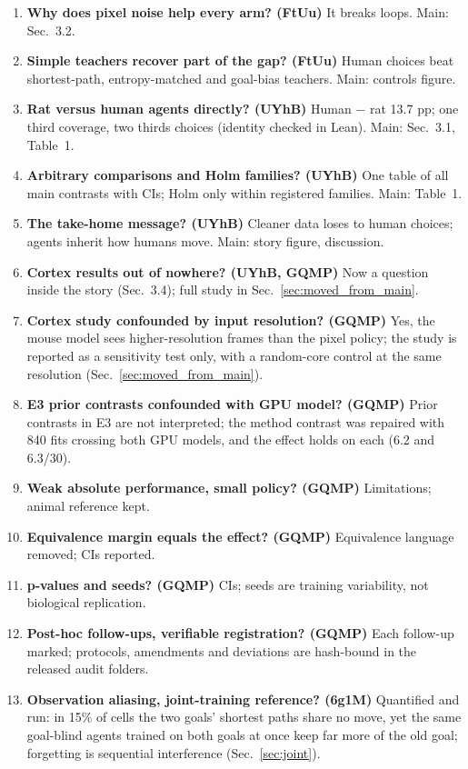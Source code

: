 \documentclass[10pt,onecolumn,letterpaper]{article}
\begin{document}
\begin{small}
\begin{enumerate}
loops, the humans' own habit of not going back. Main: story a--b, Sec.~3.2.
\item \textbf{Why does pixel noise help every arm? (FtUu)} It breaks loops. Main: Sec.~3.2.
\item \textbf{Simple teachers recover part of the gap? (FtUu)} Human choices beat shortest-path, entropy-matched and
goal-bias teachers. Main: controls figure.
\item \textbf{Rat versus human agents directly? (UYhB)} Human $-$ rat 13.7 pp; one third coverage, two thirds
choices (identity checked in Lean). Main: Sec.~3.1, Table~1.
\item \textbf{Arbitrary comparisons and Holm families? (UYhB)} One table of all main contrasts with CIs; Holm only
within registered families. Main: Table~1.
\item \textbf{The take-home message? (UYhB)} Cleaner data loses to human choices; agents inherit how humans move.
Main: story figure, discussion.
\item \textbf{Cortex results out of nowhere? (UYhB, GQMP)} Now a question inside the story (Sec.~3.4); full study in
Sec.~\ref{sec:moved_from_main}.
\item \textbf{Cortex study confounded by input resolution? (GQMP)} Yes, the mouse model sees higher-resolution frames
than the pixel policy; the study is reported as a sensitivity test only, with a random-core control at the same
resolution (Sec.~\ref{sec:moved_from_main}).
\item \textbf{E3 prior contrasts confounded with GPU model? (GQMP)} Prior contrasts in E3 are not interpreted; the
method contrast was repaired with 840 fits crossing both GPU models, and the effect holds on each (6.2 and 6.3/30).
\item \textbf{Weak absolute performance, small policy? (GQMP)} Limitations; animal reference kept.
\item \textbf{Equivalence margin equals the effect? (GQMP)} Equivalence language removed; CIs reported.
\item \textbf{p-values and seeds? (GQMP)} CIs; seeds are training variability, not biological replication.
\item \textbf{Post-hoc follow-ups, verifiable registration? (GQMP)} Each follow-up marked; protocols, amendments and
deviations are hash-bound in the released audit folders.
\item \textbf{Observation aliasing, joint-training reference? (6g1M)} Quantified and run: in 15\% of cells the two goals' shortest paths share no move, yet the same goal-blind agents trained on both goals at once keep far more of the old goal; forgetting is sequential interference (Sec.~\ref{sec:joint}).

\end{enumerate}
\end{small}
\end{document}
